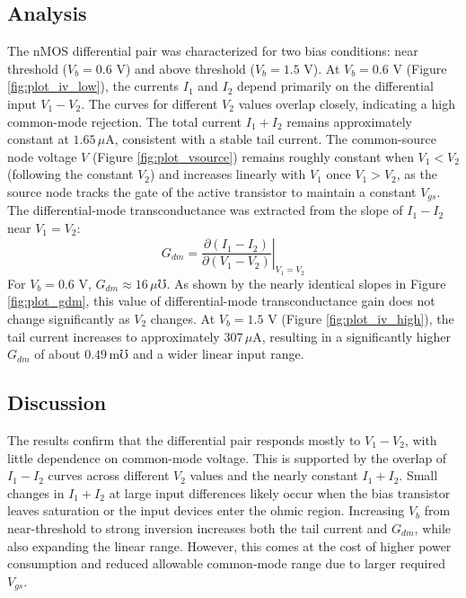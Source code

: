\documentclass[9pt,a4paper,column,twoside]{tau-class/tau}
\begin{document}
\subsection{Analysis}

The nMOS differential pair was characterized for two bias conditions: near threshold ($V_b = 0.6$ V) and above threshold ($V_b = 1.5$ V). 
At $V_b = 0.6$ V (Figure \ref{fig:plot_iv_low}), the currents $I_1$ and $I_2$ depend primarily on the differential input $V_1 - V_2$. The curves for different $V_2$ values overlap closely, indicating a high common-mode rejection. The total current $I_1 + I_2$ remains approximately constant at $1.65\,\mu\text{A}$, consistent with a stable tail current.
The common-source node voltage $V$ (Figure \ref{fig:plot_vsource}) remains roughly constant when $V_1 < V_2$ (following the constant $V_2$) and increases linearly with $V_1$ once $V_1 > V_2$, as the source node tracks the gate of the active transistor to maintain a constant $V_{gs}$.
The differential-mode transconductance was extracted from the slope of $I_1 - I_2$ near $V_1 = V_2$:
\[
G_{dm} = \left.\frac{\partial (I_1 - I_2)}{\partial (V_1 - V_2)}\right|_{V_1 = V_2}
\]
For $V_b = 0.6$ V, $G_{dm} \approx 16\,\mu\mho$. As shown by the nearly identical slopes in Figure \ref{fig:plot_gdm}, this value of differential-mode transconductance gain does not change significantly as $V_2$ changes. At $V_b = 1.5$ V (Figure \ref{fig:plot_iv_high}), the tail current increases to approximately $307\,\mu\text{A}$, resulting in a significantly higher $G_{dm}$ of about $0.49\,\text{m}\mho$ and a wider linear input range.
\subsection{Discussion}

The results confirm that the differential pair responds mostly to $V_1 - V_2$, with little dependence on common-mode voltage. This is supported by the overlap of $I_1 - I_2$ curves across different $V_2$ values and the nearly constant $I_1 + I_2$.
Small changes in $I_1 + I_2$ at large input differences likely occur when the bias transistor leaves saturation or the input devices enter the ohmic region.
Increasing $V_b$ from near-threshold to strong inversion increases both the tail current and $G_{dm}$, while also expanding the linear range. However, this comes at the cost of higher power consumption and reduced allowable common-mode range due to larger required $V_{gs}$.
\end{document}
